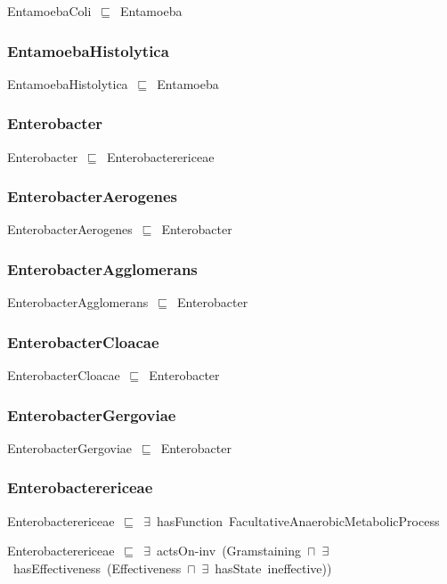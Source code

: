 \documentclass{article}
\begin{document}
EntamoebaColi~\ensuremath{\sqsubseteq}~Entamoeba~

\subsubsection*{EntamoebaHistolytica}

EntamoebaHistolytica~\ensuremath{\sqsubseteq}~Entamoeba~

\subsubsection*{Enterobacter}

Enterobacter~\ensuremath{\sqsubseteq}~Enterobacterericeae~

\subsubsection*{EnterobacterAerogenes}

EnterobacterAerogenes~\ensuremath{\sqsubseteq}~Enterobacter~

\subsubsection*{EnterobacterAgglomerans}

EnterobacterAgglomerans~\ensuremath{\sqsubseteq}~Enterobacter~

\subsubsection*{EnterobacterCloacae}

EnterobacterCloacae~\ensuremath{\sqsubseteq}~Enterobacter~

\subsubsection*{EnterobacterGergoviae}

EnterobacterGergoviae~\ensuremath{\sqsubseteq}~Enterobacter~

\subsubsection*{Enterobacterericeae}

Enterobacterericeae~\ensuremath{\sqsubseteq}~\ensuremath{\exists}~hasFunction~FacultativeAnaerobicMetabolicProcess~

Enterobacterericeae~\ensuremath{\sqsubseteq}~\ensuremath{\exists}~actsOn-inv~(Gramstaining~\ensuremath{\sqcap}~\ensuremath{\exists}~hasEffectiveness~(Effectiveness~\ensuremath{\sqcap}~\ensuremath{\exists}~hasState~ineffective))~
\end{document}
